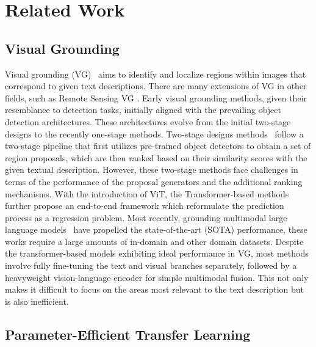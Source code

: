 \section{Related Work}
\label{sec:related work}


\subsection{Visual Grounding}
Visual grounding (VG)~\cite{yu2018mattnet,yang2019fast,deng2021transvg,xiao2023clip,liu2024dara,xiao2024hivg,lu2024lgr} aims to identify and localize regions within images that correspond to given text descriptions. 
There are many extensions of VG in other fields, such as Remote Sensing VG \cite{li2024language,li2024show,ding2024visual}.
Early visual grounding methods, given their resemblance to detection tasks, initially aligned with the prevailing object detection architectures. These architectures evolve from the initial two-stage designs to the recently one-stage methods. Two-stage designs methods~\cite{liu2019learning,hong2019learning,chen2020referring} follow a two-stage pipeline that first utilizes pre-trained object detectors to obtain a set of region proposals, which are then ranked based on their similarity scores with the given textual description. However, these two-stage methods face challenges in terms of the performance of the proposal generators and the additional ranking mechanisms. With the introduction of ViT, the Transformer-based methods~\cite{deng2021transvg,du2022vgtr,yang2022vltvg,zhu2022seqtr,su2023referring,vg-law,liu2024dara,zhu2023jmri} further propose an end-to-end framework which reformulate the prediction process as a regression problem. Most recently, grounding multimodal large language models~\cite{bai2023qwen,wang2024visionllm,wang2023cogvlm} have propelled the state-of-the-art (SOTA) performance, these works require a large amounts of in-domain and other domain datasets. Despite the transformer-based models exhibiting ideal performance in VG, most methods involve fully fine-tuning the text and visual branches separately, followed by a heavyweight vision-language encoder for simple multimodal fusion. This not only makes it difficult to focus on the areas most relevant to the text description but is also inefficient.



\subsection{Parameter-Efficient Transfer Learning}

